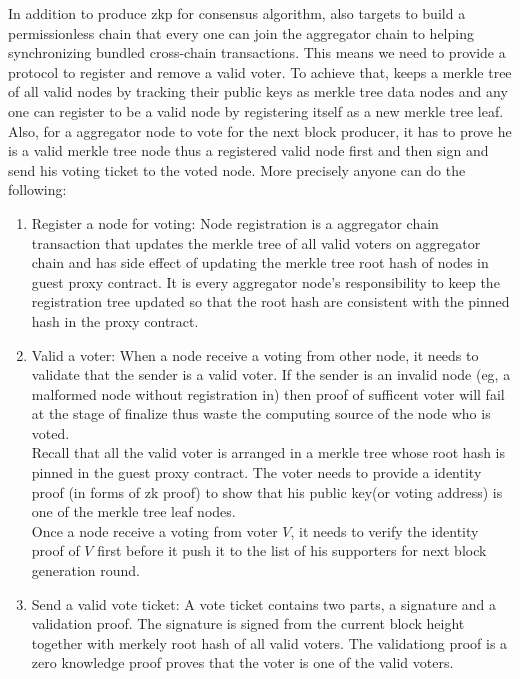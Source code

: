 \documentclass[pageno]{jpaper}
\begin{document}
In addition to produce zkp for consensus algorithm, \dprotocol also targets to build a permissionless chain that every one can join the aggregator chain to helping synchronizing bundled cross-chain transactions. This means we need to provide a protocol to register and remove a valid voter. To achieve that, \dprotocol keeps a merkle tree of all valid nodes by tracking their public keys as merkle tree data nodes and any one can register to be a valid node by registering itself as a new merkle tree leaf. Also, for a aggregator node to vote for the next block producer, it has to prove he is a valid merkle tree node thus a registered valid node first and then sign and send his voting ticket to the voted node. More precisely anyone can do the following:
\begin{enumerate}[leftmargin=*]
\item Register a node for voting:
    Node registration is a aggregator chain transaction that updates the merkle tree of all valid voters on aggregator chain and has side effect of updating the merkle tree root hash of nodes in guest proxy contract. It is every aggregator node's responsibility to keep the registration tree updated so that the root hash are consistent with the pinned hash in the proxy contract. \\

\item Valid a voter:
    When a node receive a voting from other node, it needs to validate that the sender is a valid voter. If the sender is an invalid node (eg, a malformed node without registration in) then proof of sufficent voter will fail at the stage of finalize thus waste the computing source of the node who is voted.\\

    Recall that all the valid voter is arranged in a merkle tree whose root hash is pinned in the guest proxy contract. The voter needs to provide a identity proof (in forms of zk proof) to show that his public key(or voting address) is one of the merkle tree leaf nodes.\\

    Once a node receive a voting from voter $V$, it needs to verify the identity proof of $V$ first before it push it to the list of his supporters for next block generation round.\\

\item Send a valid vote ticket:
    A vote ticket contains two parts, a signature and a validation proof. The signature is signed from the current block height together with merkely root hash of all valid voters. The validationg proof is a zero knowledge proof proves that the voter is one of the valid voters. 
\end{enumerate}
\end{document}
